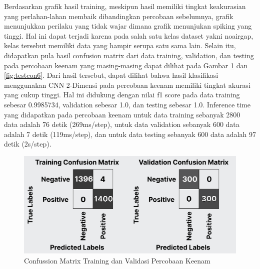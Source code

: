 Berdasarkan grafik hasil training, meskipun hasil memiliki tingkat keakurasian yang perlahan-lahan membaik dibandingkan percobaan sebelumnya, grafik menunjukkan perilaku yang tidak wajar dimana grafik menunjukan spiking yang tinggi. Hal ini dapat terjadi karena pada salah satu kelas dataset yakni noairgap, kelas tersebut memiliki data yang hampir serupa satu sama lain. Selain itu, didapatkan pula hasil confusion matrix dari data training, validation, dan testing pada percobaan keenam yang masing-masing dapat dilihat pada Gambar \ref{fig:tvcon6} dan \ref{fig:testcon6}. Dari hasil tersebut, dapat dilihat bahwa hasil klasifikasi menggunakan CNN 2-Dimensi pada percobaan keenam memiliki tingkat akurasi yang cukup tinggi. Hal ini didukung dengan nilai f1 score pada data training sebesar 0.9985734, validation sebesar 1.0, dan testing sebesar 1.0. Inference time yang didapatkan pada percobaan keenam untuk data training sebanyak 2800 data adalah 76 detik (269ms/step), untuk data validation sebanyak 600 data adalah 7 detik (119ms/step), dan untuk data testing sebanyak 600 data adalah 97 detik (2s/step).

\begin{figure} [H] \centering
    \includegraphics[scale=0.3]{gambar/bab4/tvcon6.png}
    \caption{Confussion Matrix Training dan Validasi Percobaan Keenam}
    \label{fig:tvcon6}
\end{figure}

